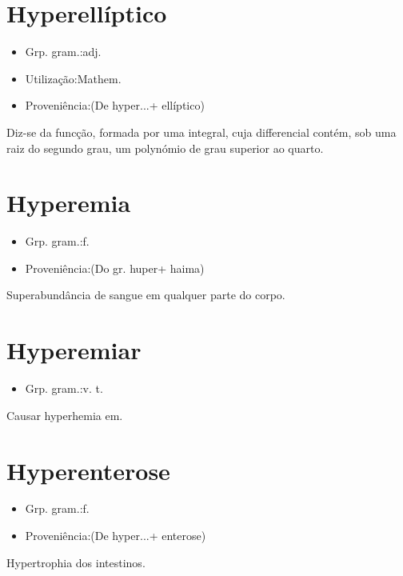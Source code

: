 \documentclass{article}
\begin{document}
\section{Hyperellíptico}
\begin{itemize}
\item {Grp. gram.:adj.}
\end{itemize}
\begin{itemize}
\item {Utilização:Mathem.}
\end{itemize}
\begin{itemize}
\item {Proveniência:(De \textunderscore hyper...\textunderscore  + \textunderscore ellíptico\textunderscore )}
\end{itemize}
Diz-se da funcção, formada por uma integral, cuja differencial contém, sob uma raiz do segundo grau, um polynómio de grau superior ao quarto.
\section{Hyperemia}
\begin{itemize}
\item {Grp. gram.:f.}
\end{itemize}
\begin{itemize}
\item {Proveniência:(Do gr. \textunderscore huper\textunderscore  + \textunderscore haima\textunderscore )}
\end{itemize}
Superabundância de sangue em qualquer parte do corpo.
\section{Hyperemiar}
\begin{itemize}
\item {Grp. gram.:v. t.}
\end{itemize}
Causar hyperhemia em.
\section{Hyperenterose}
\begin{itemize}
\item {Grp. gram.:f.}
\end{itemize}
\begin{itemize}
\item {Proveniência:(De \textunderscore hyper...\textunderscore  + \textunderscore enterose\textunderscore )}
\end{itemize}
Hypertrophia dos intestinos.
\end{document}
